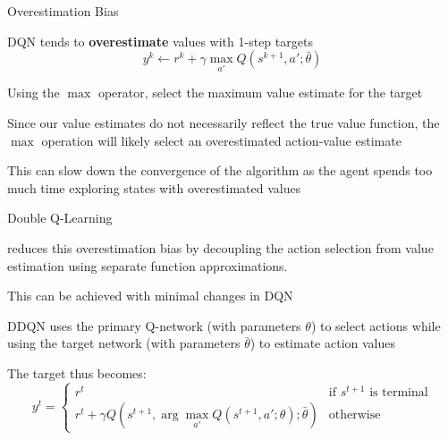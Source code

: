 \begin{frame}[t]{Overestimation Bias}

\begin{problembox}
    DQN tends to \textbf{overestimate} values with 1-step targets
    \vspace{0pt}
    \[
    y^k \gets r^k + \gamma \max_{a'} Q(s^{k+1}, a'; \bar{\theta})
    \]

    \only\blist
        \item Using the $\max$ operator, select the maximum value estimate for the target 
        \item Since our value estimates do not necessarily reflect the true value function, the $\max$ operation will likely select an overestimated action-value estimate
        \item  This can slow down the convergence of the algorithm as the agent spends too much time exploring states with overestimated values
    \elist
\end{problembox}

\end{frame}

\begin{frame}[t]{Double Q-Learning}

\begin{solutionbox}
     reduces this overestimation bias by decoupling the action selection from value estimation using separate function approximations.

    \blist
        \item This can be achieved with minimal changes in DQN
        \item DDQN  uses the primary Q-network (with parameters $\theta$) to select actions while using the target network (with parameters $\bar{\theta}$) to estimate action values
        \item The target thus becomes:
    \elist
    \vspace{0pt}
    \[
    y^t = \begin{cases} 
    r^t & \text{if } s^{t+1} \text{ is terminal} \\
    r^t + \gamma Q(s^{t+1}, \arg\max_{a'} Q(s^{t+1}, a'; \theta); \bar{\theta}) & \text{otherwise}
    \end{cases}
    \]
\end{solutionbox}
    
\end{frame}

